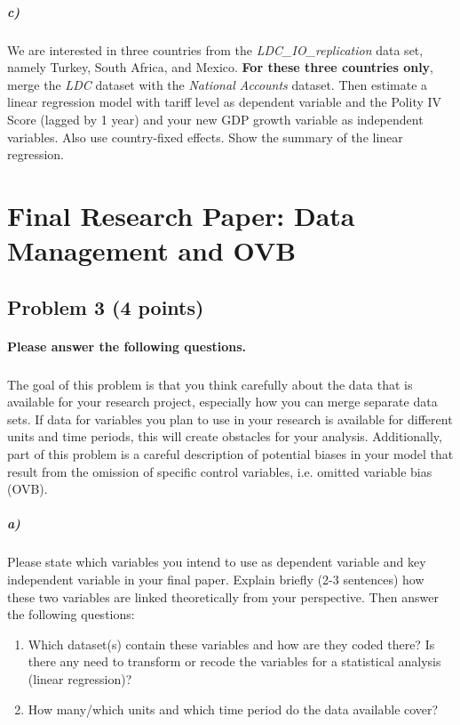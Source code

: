 \documentclass[12pt]{article}
\begin{document}
\subparagraph{c)} We are interested in three countries from the \textit{LDC\_IO\_replication} data set, namely Turkey, South Africa, and Mexico. \textbf{For these three countries only}, merge the \textit{LDC} dataset with the \textit{National Accounts} dataset. Then estimate a linear regression model with tariff level as dependent variable and the Polity IV Score (lagged by 1 year) and your new GDP growth variable as independent variables. Also use country-fixed effects. Show the summary of the linear regression.



\section*{Final Research Paper: Data Management and OVB}

\subsection*{Problem 3 (4 points)}

\paragraph{Please answer the following questions.}

\subparagraph{} The goal of this problem is that you think carefully about the data that is available for your research project, especially how you can merge separate data sets. If data for variables you plan to use in your research is available for different units and time periods, this will create obstacles for your analysis. Additionally, part of this problem is a careful description of potential biases in your model that result from the omission of specific control variables, i.e. omitted variable bias (OVB).

\subparagraph{a)} Please state which variables you intend to use as dependent variable and key independent variable in your final paper. Explain briefly (2-3 sentences) how these two variables are linked theoretically from your perspective. Then answer the following questions:

\begin{enumerate}
	\item Which dataset(s) contain these variables and how are they coded there? Is there any need to transform or recode the variables for a statistical analysis (linear regression)?
	\item How many/which units and which time period do the data available cover?
\end{enumerate}
\end{document}
